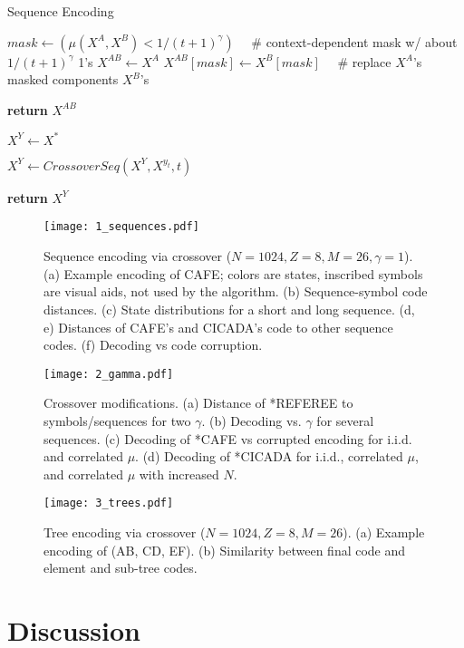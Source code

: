 \documentclass{article}
\begin{document}
\begin{algorithm}
\caption{Sequence Encoding}

\begin{algorithmic}[0]

\State $mask \gets (\mu(X^A, X^B) < 1/(t+1)^\gamma) \quad$  \# context-dependent mask w/ about $1/(t+1)^\gamma$ 1's
\State $X^{AB} \gets X^A$
\State $X^{AB}[mask] \gets X^B[mask] \quad$  \# replace $X^A$'s masked components $X^B$'s

\State \textbf{return} $X^{AB}$
\EndFunction

\State $X^Y \gets X^*$

\State $X^Y \gets CrossoverSeq(X^Y, X^{y_t}, t)$

\EndFor

\State \textbf{return} $X^Y$
\EndFunction

\end{algorithmic}
\end{algorithm}

\begin{figure}
  \centering
  \texttt{[image: 1\_sequences.pdf]}
  \caption{Sequence encoding via crossover ($N=1024, Z=8, M=26, \gamma=1$). (a) Example encoding of CAFE; colors are states, inscribed symbols are visual aids, not used by the algorithm. (b) Sequence-symbol code distances. (c) State distributions for a short and long sequence. (d, e) Distances of CAFE's and CICADA's code to other sequence codes. (f) Decoding vs code corruption.}
\end{figure}

\begin{figure}
  \centering
  \texttt{[image: 2\_gamma.pdf]}
  \caption{Crossover modifications. (a) Distance of *REFEREE to symbols/sequences for two $\gamma$. (b) Decoding vs. $\gamma$ for several sequences. (c) Decoding of *CAFE vs corrupted encoding for i.i.d. and correlated $\mu$. (d) Decoding of *CICADA for i.i.d., correlated $\mu$, and correlated $\mu$ with increased $N$.}
\end{figure}

\begin{figure}
  \centering
  \texttt{[image: 3\_trees.pdf]}
  \caption{Tree encoding via crossover ($N=1024, Z=8, M=26$). (a) Example encoding of (AB, CD, EF). (b) Similarity between final code and element and sub-tree codes.}
\end{figure}

\section{Discussion}
\end{document}
